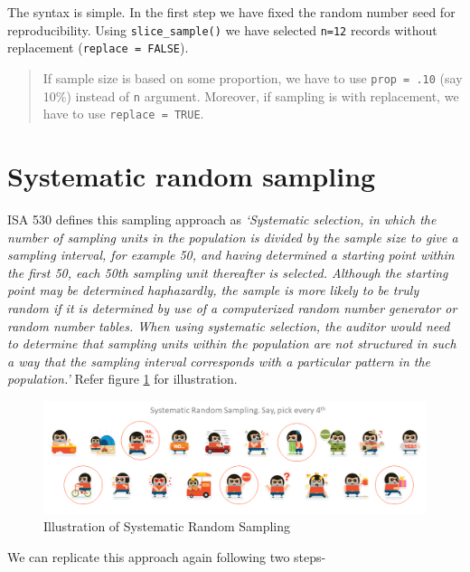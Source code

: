 \documentclass[
]{book}
\begin{document}
The syntax is simple. In the first step we have fixed the random number seed for reproducibility. Using \texttt{slice\_sample()} we have selected \texttt{n=12} records without replacement (\texttt{replace\ =\ FALSE}).

\begin{quote}
If sample size is based on some proportion, we have to use \texttt{prop\ =\ .10} (say 10\%) instead of \texttt{n} argument. Moreover, if sampling is with replacement, we have to use \texttt{replace\ =\ TRUE}.
\end{quote}

\hypertarget{srs}{%
\section{Systematic random sampling}\label{srs}}

ISA 530 defines this sampling approach as \emph{`Systematic selection, in which the number of sampling units in the population is divided by the sample size to give a sampling interval, for example 50, and having determined a starting point within the first 50, each 50th sampling unit thereafter is selected. Although the starting point may be determined haphazardly, the sample is more likely to be truly random if it is determined by use of a computerized random number generator or random number tables. When using systematic selection, the auditor would need to determine that sampling units within the population are not structured in such a way that the sampling interval corresponds with a particular pattern in the population.'} Refer figure \ref{fig:systematic} for illustration.

\begin{figure}

{\centering \includegraphics[width=0.99\linewidth]{images/systematic} 

}

\caption{Illustration of Systematic Random Sampling}\label{fig:systematic}
\end{figure}

We can replicate this approach again following two steps-
\end{document}
